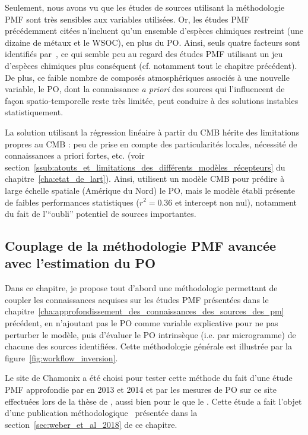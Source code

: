 Seulement, nous avons vu que les études de sources utilisant la méthodologie PMF sont très
sensibles aux variables utilisées. Or, les études PMF précédemment citées n'incluent qu'un
ensemble d'espèces chimiques restreint (une dizaine de métaux et le WSOC), en plus du PO.
Ainsi, seuls quatre facteurs sont identifiés par~\cite{fangOxidative2016}, ce qui semble peu au regard
des études PMF utilisant un jeu d'espèces chimiques plus conséquent (cf.  notamment tout
le chapitre précédent). De plus, ce faible nombre de composés atmosphériques associés à
une nouvelle variable, le PO, dont la connaissance \textit{a priori} des sources qui
l'influencent de façon spatio-temporelle reste très limitée, peut conduire à des solutions
instables statistiquement.

La solution utilisant la régression linéaire à partir du CMB hérite des limitations
propres au CMB : peu de prise en compte des particularités locales, nécessité de
connaissances a priori fortes, etc. (voir
section~\ref{ssub:atouts_et_limitations_des_différents_modèles_récepteurs} du
chapitre~\ref{cha:etat_de_lart}).  Ainsi, \cite{batesSource2018} utilisent un modèle CMB
pour prédire à large échelle spatiale (Amérique du Nord) le PO, mais le modèle établi
présente de faibles performances statistiques ($r^2 = 0.36$ et intercept non nul),
notamment du fait de l'``oubli'' potentiel de sources importantes.

\subsection{Couplage de la méthodologie PMF avancée avec l'estimation du PO}%
\label{sub:couplage_de_pmf_avancée_avec_l_estimation_du_po}

Dans ce chapitre, je propose tout d'abord une méthodologie permettant de coupler les
connaissances acquises sur les études PMF présentées
dans le chapitre~\ref{cha:approfondissement_des_connaissances_des_sources_des_pm}
précédent, en n'ajoutant pas le PO comme variable explicative pour ne pas perturber le
modèle, puis d'évaluer le PO intrinsèque (i.e. par microgramme) de chacune des sources
identifiées. Cette méthodologie générale est illustrée par la figure~\ref{fig:workflow_inversion}.

Le site de Chamonix a été choisi pour tester cette méthode du fait d'une étude PMF
approfondie par \cite{chevrierChauffage2016} en 2013 et 2014 et par les mesures de PO sur
ce site effectuées lors de la thèse de \cite{calasPollution2017}, aussi bien pour le
\POAA{} que le \PODTT. Cette étude a fait l'objet d'une publication
méthodologique~\autocite{weberApportionment2018} présentée dans la
section~\ref{sec:weber_et_al_2018} de ce chapitre.

